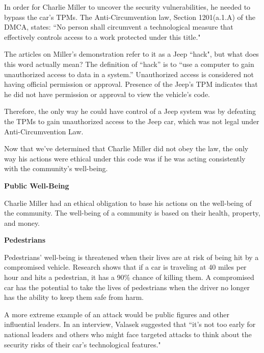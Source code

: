 \documentclass[12pt]{article}
\begin{document}
\begin{multicols}{2}
In order for Charlie Miller to uncover the security vulnerabilities, he needed to bypass the car's TPMs. \cite{brokeDMCA} The Anti-Circumvention law, Section 1201(a.1.A) of the DMCA, states: ``No person shall circumvent a technological measure that effectively controls access to a work protected under this title."\cite{DMCA}

The articles on Miller's demonstration refer to it as a Jeep ``hack", but what does this word actually mean? The definition of ``hack'' is to ``use a computer to gain unauthorized access to data in a system.''\cite{dictionary} Unauthorized access is considered not having official permission or approval. \cite{dictionary} Presence of the Jeep's TPM indicates that he did not have permission or approval to view the vehicle's code.

Therefore, the only way he could have control of a Jeep system was by defeating the TPMs to gain unauthorized access to the Jeep car, which was not legal under Anti-Circumvention Law.\cite{DMCA}




Now that we've determined that Charlie Miller did not obey the law, the only way his actions were ethical under this code was if he was acting consistently with the community's well-being.

\vspace{.5cm}\hspace{-.5cm}\textbf{Public Well-Being}\vspace{.2cm}

Charlie Miller had an ethical obligation to base his actions on the well-being of the community. \cite{seCode} The well-being of a community is based on their health, property, and money.

\vspace{.2cm}\textbf{Pedestrians}

Pedestrians' well-being is threatened when their lives are at risk of being hit by a compromised vehicle. Research shows that if a car is traveling at 40 miles per hour and hits a pedestrian, it has a 90\% chance of killing them.\cite{killSpeed} A compromised car has the potential to take the lives of pedestrians when the driver no longer has the ability to keep them safe from harm. 

A more extreme example of an attack would be public figures and other influential leaders. In an interview, Valasek suggested that ``it's not too early for national leaders and others who might face targeted attacks to think about the security risks of their car's technological features."\cite{hackingRisk}


\end{multicols}
\end{document}
